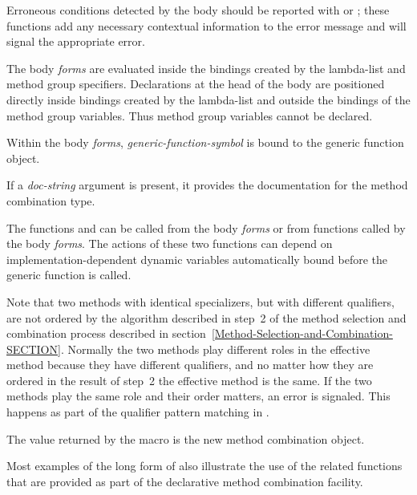 \begin{defmac}
Erroneous conditions detected by the body should be reported with
 or
; these functions
add any necessary contextual information to the error message and will
signal the appropriate error.

The body \emph{forms} are evaluated inside the bindings created by the
lambda-list and method group specifiers.  Declarations at the head of
the body are positioned directly inside bindings created by the
lambda-list and outside the bindings of the method group variables. 
Thus method group variables cannot be declared.

Within the body \emph{forms}, \emph{generic-function-symbol}
is bound to the generic function object.

If a \emph{doc-string} argument is present, it provides the
documentation for the method combination type.

The functions  and 
 can be called from the body \emph{forms} or
from functions called by the body \emph{forms}.  The actions of these
two functions can depend on implementation-dependent dynamic variables
automatically bound before the generic function 
 is called.

Note that two methods with identical specializers, but with different
qualifiers, are not ordered by the algorithm described in step~2 of
the method selection and combination process described in
section~\ref{Method-Selection-and-Combination-SECTION}.
Normally the two methods play
different roles in the effective method because they have different
qualifiers, and no matter how they are ordered in the result of step~2
the effective method is the same.  If the two methods play the same
role and their order matters, an error is signaled.  This happens as
part of the qualifier pattern matching in 
.

The value returned by the  macro is the new
method combination object.

Most examples of the long form of  also
illustrate the use of the related functions that are provided as part
of the declarative method combination facility.


\end{defmac}
